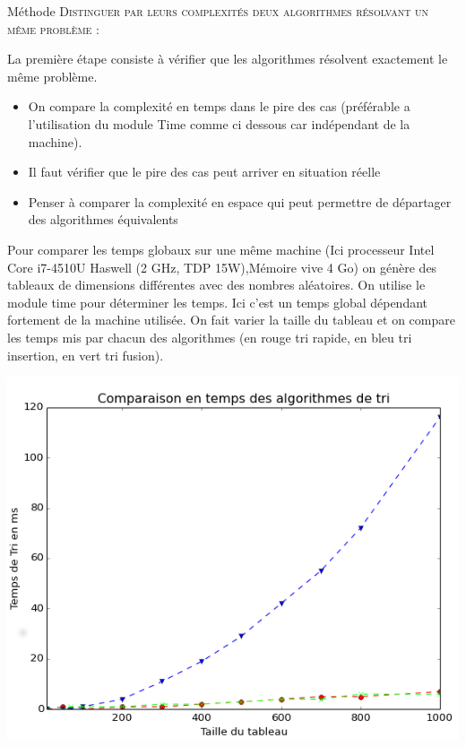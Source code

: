 
\begin{prop}{Méthode}
\textsc{Distinguer par leurs complexités deux algorithmes résolvant
un même problème :}

La première étape consiste à vérifier que les algorithmes résolvent exactement le même problème.

\begin{itemize}
\item On compare la complexité en temps dans le pire des cas (préférable a l'utilisation du module Time comme ci dessous car indépendant de la machine).
\item Il faut vérifier que le pire des cas peut arriver en situation réelle
\item Penser à comparer la complexité en espace qui peut permettre de départager des algorithmes équivalents
\end{itemize}
\end{prop}

\begin{exemple2}

Pour comparer les temps globaux sur une même machine (Ici processeur	Intel Core i7-4510U Haswell (2 GHz, TDP 15W),Mémoire vive 4 Go) on génère des tableaux de dimensions différentes avec des nombres aléatoires.
On utilise le module time pour déterminer les temps. Ici c'est un temps global dépendant fortement de la machine utilisée.
On fait varier la taille du tableau et on compare les temps mis par chacun des algorithmes (en rouge tri rapide, en bleu tri insertion, en vert tri fusion). 

\begin{center}
\includegraphics[width=.7\textwidth]{images/Fin.png}
\end{center}

\end{exemple2}




